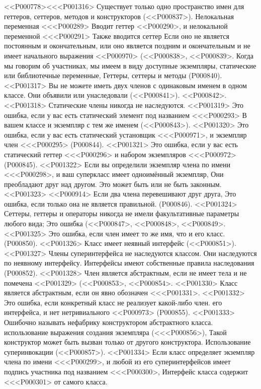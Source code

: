 {{{{{{{{{{{{{{{{{{{{{{{{{{{{{{{{{{{{{<<P000778><<<P001316> Существует только одно пространство имен
для геттеров, сеттеров, методов и конструкторов (<<P000837>).
Нелокальная переменная <<<P000289> Вводит геттер <<P000290>,
и нелокальной переменной <<<P000291>
Также вводится сеттер
Если оно не является постоянным и окончательным,
или оно является поздним и окончательным и не имеет начального выражения
<<P000970> (<<P000838>, <<P000839>.
Когда мы говорим об участниках, мы имеем в виду
доступные экземпляры, статические или библиотечные переменные,
Геттеры, сеттеры и методы
(P000840).
<<P001317> Вы не можете иметь двух членов с одинаковым именем в одном классе.
Они объявили или унаследовали (<<P000841>). <<P000842>.
<<P001318> Статические члены никогда не наследуются.
<<P001319> Это ошибка, если у вас есть статический элемент под названием <<<P000293> В вашем классе
и экземпляр с тем же именем
(<<P000843>).
<<P001320> Это ошибка, если у вас есть статический установщик <<<P000971>,
и экземпляр член <<<P000295> (P000844).
<<P001321> Это ошибка, если у вас есть статический геттер <<<P000296>
и набором экземпляров <<<P000972> (P000845).
<<P001322> Если вы определили экземпляр члена по имени <<<P000298>,
и ваш суперкласс имеет одноимённый экземпляр,
Они преобладают друг над другом.
Это может быть или не быть законным.
<<P001323> <<P000914>
Если два члена перевешивают друг друга,
Это ошибка, если только она не является правильной.
(P000846).
<<P001324> Сеттеры, геттеры и операторы никогда не имели
факультативные параметры любого вида;
Это ошибка (<<P000847>, <<P000848>, <<P000849>.
<<P001325>
Это ошибка, если член имеет то же имя, что и его класс.
(P000850).
<<P001326> Класс имеет неявный интерфейс (<<P000851>).
<<P001327> Члены суперинтерфейса не наследуются классом.
Они наследуются по неявному интерфейсу.
Интерфейсы имеют собственные правила наследования
(P000852).
<<P001328> Член является абстрактным, если
не имеет тела и не помечена <<P001329>
(<<P000853>, <<P000854>.
<<P001330> Класс является абстрактным, если он явно обозначен <<<P001331>.
<<P001332> Это ошибка, если конкретный класс не реализует какой-либо член.
его интерфейса, и нет нетривиального <<P000973>
(P000855).
<<P001333> Ошибочно называть нефабрику конструктором абстрактного класса.
использование выражения создания экземпляра (<<<P000856>),
Такой конструктор может быть вызван только от другого конструктора.
Использование суперинвокации (<<P000857>).
<<P001334> Если класс определяет экземпляр члена по имени <<<P000299>,
и любой из его суперинтерфейсов имеет подпись участника под названием <<<P000300>,
Интерфейс класса содержит <<<P000301> от самого класса.
}}}}}}}}}}}}}}}}}}}}}}}}}}}}}}}}}}}}}
